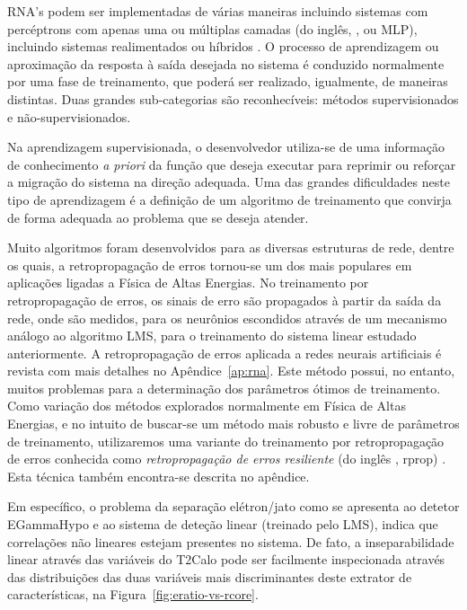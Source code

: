 RNA's podem ser implementadas de várias maneiras incluindo sistemas com
percéptrons com apenas uma ou múltiplas camadas (do inglês, , ou MLP), incluindo sistemas realimentados ou híbridos
\cite{haykin}. O processo de aprendizagem ou aproximação da resposta à saída
desejada no sistema é conduzido normalmente por uma fase de treinamento, que
poderá ser realizado, igualmente, de maneiras distintas. Duas grandes
sub-categorias são reconhecíveis: métodos supervisionados e
não-supervisionados.

Na aprendizagem supervisionada, o desenvolvedor utiliza-se de uma informação
de conhecimento \textit{a priori} da função que deseja executar para reprimir
ou reforçar a migração do sistema na direção adequada. Uma das grandes
dificuldades neste tipo de aprendizagem é a definição de um algoritmo de
treinamento que convirja de forma adequada ao problema que se deseja atender.

Muito algoritmos foram desenvolvidos para as diversas estruturas de rede,
dentre os quais, a retropropagação de erros tornou-se um dos mais populares em
aplicações ligadas a Física de Altas Energias. No treinamento por
retropropagação de erros, os sinais de erro são propagados à partir da saída
da rede, onde são medidos, para os neurônios escondidos através de um
mecanismo análogo ao algoritmo LMS, para o treinamento do sistema linear
estudado anteriormente. A retropropagação de erros aplicada a redes neurais
artificiais é revista com mais detalhes no Apêndice~\ref{ap:rna}. Este método
possui, no entanto, muitos problemas para a determinação dos parâmetros ótimos
de treinamento. Como variação dos métodos explorados normalmente em Física de
Altas Energias, e no intuito de buscar-se um método mais robusto e livre de
parâmetros de treinamento, utilizaremos uma variante do treinamento por
retropropagação de erros conhecida como \textit{retropropagação de erros
resiliente} (do inglês , rprop)
\cite{rprop}. Esta técnica também encontra-se descrita no apêndice.

Em específico, o problema da separação elétron/jato como se apresenta ao
detetor EGammaHypo e ao sistema de deteção linear (treinado pelo LMS), indica
que correlações não lineares estejam presentes no sistema. De fato, a
inseparabilidade linear através das variáveis do T2Calo pode ser facilmente
inspecionada através das distribuições das duas variáveis mais discriminantes
deste extrator de características, na Figura~\ref{fig:eratio-vs-rcore}.

